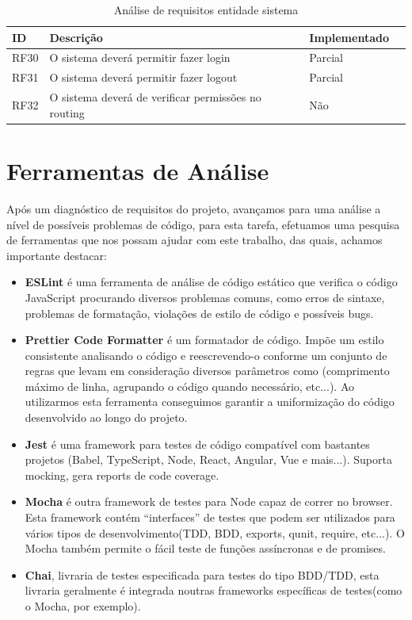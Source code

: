 \documentclass[a4paper,12pt]{article} %
\begin{document}
\begin{table}[H]
	\centering
	\begin{tabular}{|l|p{12cm}|l|r|}
		\hline
		\textbf{ID} & \textbf{Descrição} & \textbf{Implementado}\\
		\hline
		RF30 & O sistema deverá permitir fazer login & Parcial\footnotemark[4] \\
		\hline
		RF31 & O sistema deverá permitir fazer logout & Parcial\footnotemark[4] \\
		\hline
		RF32 & O sistema deverá de verificar permissões no routing & Não \\
		\hline
	\end{tabular}
	\caption{Análise de requisitos entidade sistema}
\end{table}

\newpage
\section{Ferramentas de Análise}
Após um diagnóstico de requisitos do projeto, avançamos para uma análise a nível de possíveis problemas de código, para esta tarefa, efetuamos uma pesquisa de ferramentas que nos possam ajudar com este trabalho, das quais, achamos importante destacar:

\begin{itemize}
	\item \textbf{ESLint} é uma ferramenta de análise de código estático que verifica o código JavaScript procurando diversos problemas comuns, como erros de sintaxe, problemas de formatação, violações de estilo de código e possíveis bugs.

	\item \textbf{Prettier Code Formatter} é um formatador de código. Impõe um estilo consistente analisando o código e reescrevendo-o conforme um conjunto de regras que levam em consideração diversos parâmetros como (comprimento máximo de linha, agrupando o código quando necessário, etc...). Ao utilizarmos esta ferramenta conseguimos garantir a uniformização do código desenvolvido ao longo do projeto.

	\item \textbf{Jest} é uma framework para testes de código compatível com bastantes projetos (Babel, TypeScript, Node, React, Angular, Vue e mais...). Suporta mocking, gera reports de code coverage.

	\item \textbf{Mocha} é outra framework de testes para Node capaz de correr no browser. Esta framework contém “interfaces” de testes que podem ser utilizados para vários tipos de desenvolvimento(TDD, BDD, exports, qunit, require, etc...). O Mocha também permite o fácil teste de funções assíncronas e de promises.

	\item \textbf{Chai}, livraria de testes especificada para testes do tipo BDD/TDD, esta livraria geralmente é integrada noutras frameworks específicas de testes(como o Mocha, por exemplo).
\end{itemize}
\end{document}
